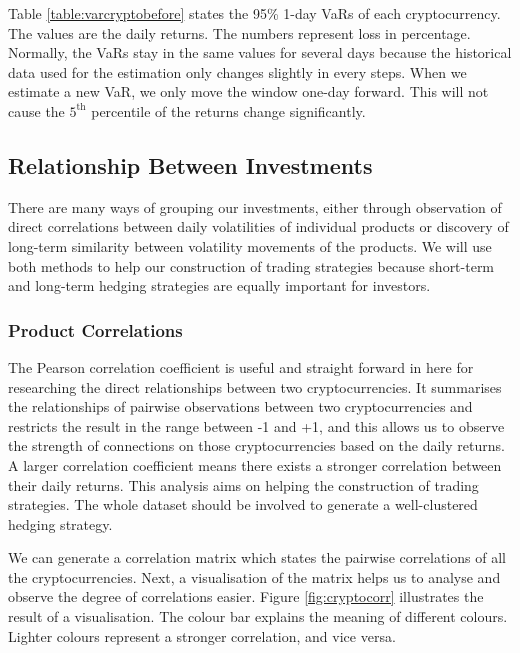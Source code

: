 \documentclass[11pt]{article} %
\theoremstyle{plain}
\theoremstyle{definition}
\begin{document}
Table \ref{table:varcryptobefore} states the 95\% 1-day VaRs of each cryptocurrency. The values are the daily returns. The numbers represent loss in percentage. Normally, the VaRs stay in the same values for several days because the historical data used for the estimation only changes slightly in every steps. When we estimate a new VaR, we only move the window one-day forward. This will not cause the $5^{\mathrm{th}}$ percentile of the returns change significantly.

\subsection{Relationship Between Investments}

There are many ways of grouping our investments, either through observation of direct correlations between daily volatilities of individual products or discovery of long-term similarity between volatility movements of the products. We will use both methods to help our construction of trading strategies because short-term and long-term hedging strategies are equally important for investors.

\subsubsection{Product Correlations}

The Pearson correlation coefficient is useful and straight forward in here for researching the direct relationships between two cryptocurrencies. It summarises the relationships of pairwise observations between two cryptocurrencies and restricts the result in the range between -1 and +1, and this allows us to observe the strength of connections on those cryptocurrencies based on the daily returns. A larger correlation coefficient means there exists a stronger correlation between their daily returns. This analysis aims on helping the construction of trading strategies. The whole dataset should be involved to generate a well-clustered hedging strategy.

We can generate a correlation matrix which states the pairwise correlations of all the cryptocurrencies. Next, a visualisation of the matrix helps us to analyse and observe the degree of correlations easier. Figure \ref{fig:cryptocorr} illustrates the result of a visualisation. The colour bar explains the meaning of different colours. Lighter colours represent a stronger correlation, and vice versa.
\end{document}
